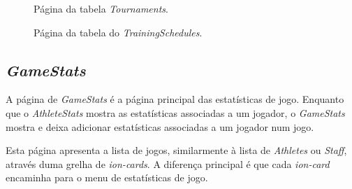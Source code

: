 \begin{figure}[h]
	\begin{center}
	\end{center}
	\caption{Página da tabela \textit{Tournaments}.}\label{fig:tournaments}
\end{figure}
\begin{figure}[h]
	\begin{center}
	\end{center}
	\caption{Página da tabela do \textit{TrainingSchedules}.}\label{fig:athleteprofile}
\end{figure}
\newpage

\subsection{\textit{GameStats}}\label{subsec427}
A página de \textit{GameStats} é a página principal das estatísticas de jogo. Enquanto que o \textit{AthleteStats} mostra as estatísticas associadas a um jogador, o \textit{GameStats} mostra e deixa adicionar estatísticas associadas a um jogador num jogo.

Esta página apresenta a lista de jogos, similarmente à lista de \textit{Athletes} ou \textit{Staff}, através duma grelha de \textit{ion-cards}. A diferença principal é que cada \textit{ion-card} encaminha para o menu de estatísticas de jogo. 

